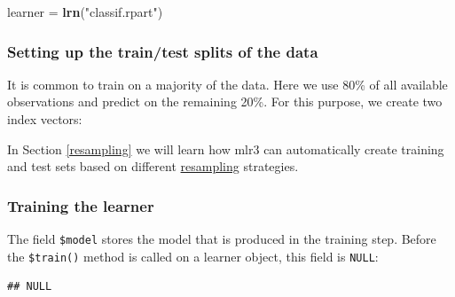 \documentclass[]{article}
\newenvironment{Shaded}{\begin{snugshade}}{\end{snugshade}}
\newcommand{\FloatTok}[1]{\textcolor[rgb]{0.00,0.00,0.81}{#1}}
\newcommand{\KeywordTok}[1]{\textcolor[rgb]{0.13,0.29,0.53}{\textbf{#1}}}
\newcommand{\NormalTok}[1]{#1}
\newcommand{\OperatorTok}[1]{\textcolor[rgb]{0.81,0.36,0.00}{\textbf{#1}}}
\newcommand{\StringTok}[1]{\textcolor[rgb]{0.31,0.60,0.02}{#1}}
\renewenvironment{Shaded} {\begin{snugshade}\small} {\end{snugshade}}
\begin{document}
\begin{Shaded}
\begin{Highlighting}[]
\NormalTok{learner =}\StringTok{ }\KeywordTok{lrn}\NormalTok{(}\StringTok{"classif.rpart"}\NormalTok{)}
\end{Highlighting}
\end{Shaded}

\hypertarget{split-data}{%
\subsubsection{Setting up the train/test splits of the data}\label{split-data}}

It is common to train on a majority of the data.
Here we use 80\% of all available observations and predict on the remaining 20\%.
For this purpose, we create two index vectors:

\begin{Shaded}
\end{Shaded}

In Section \ref{resampling} we will learn how mlr3 can automatically create training and test sets based on different \protect\hyperlink{resampling}{resampling} strategies.

\hypertarget{training}{%
\subsubsection{Training the learner}\label{training}}

The field \texttt{\$model} stores the model that is produced in the training step.
Before the \texttt{\$train()} method is called on a learner object, this field is \texttt{NULL}:

\begin{Shaded}
\end{Shaded}

\begin{verbatim}
## NULL
\end{verbatim}
\end{document}
